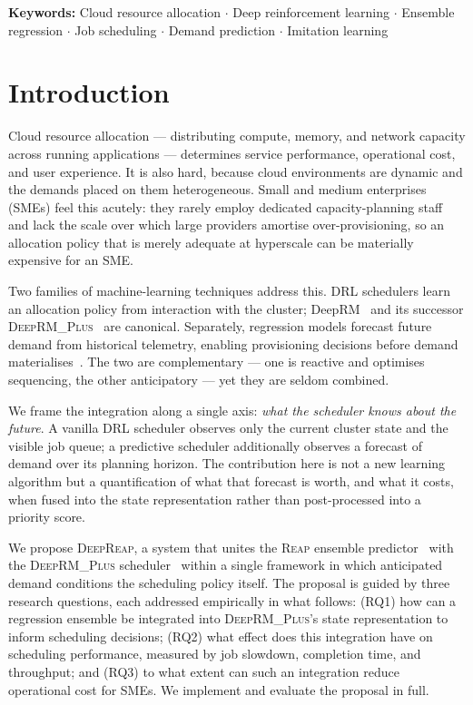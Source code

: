 \documentclass{svproc}
\newcommand{\reap}{\textsc{Reap}}
\newcommand{\deeprm}{\textsc{DeepRM\_Plus}}
\newcommand{\deepreap}{\textsc{DeepReap}}
\begin{document}
\noindent\textbf{Keywords:} Cloud resource allocation $\cdot$ Deep reinforcement learning $\cdot$ Ensemble regression $\cdot$ Job scheduling $\cdot$ Demand prediction $\cdot$ Imitation learning

\section{Introduction}
Cloud resource allocation --- distributing compute, memory, and network
capacity across running applications --- determines service
performance, operational cost, and user experience. It is also hard,
because cloud environments are dynamic and the demands placed on them
heterogeneous. Small and medium enterprises (SMEs) feel this acutely:
they rarely employ dedicated capacity-planning staff and lack the scale
over which large providers amortise over-provisioning, so an allocation
policy that is merely adequate at hyperscale can be materially
expensive for an SME.

Two families of machine-learning techniques address this. DRL
schedulers learn an allocation policy from interaction with the
cluster; DeepRM~\cite{mao2016} and its successor
\deeprm{}~\cite{guo2021} are canonical. Separately, regression models
forecast future demand from historical telemetry, enabling
provisioning decisions before demand
materialises~\cite{bankole2013,kaur2019}. The two are complementary ---
one is reactive and optimises sequencing, the other anticipatory --- yet
they are seldom combined.

We frame the integration along a single axis: \emph{what the scheduler
knows about the future}. A vanilla DRL scheduler observes only the
current cluster state and the visible job queue; a predictive
scheduler additionally observes a forecast of demand over its planning
horizon. The contribution here is not a new learning algorithm but a
quantification of what that forecast is worth, and what it costs, when
fused into the state representation rather than post-processed into a
priority score.

We propose \deepreap{}, a system that unites the \reap{} ensemble
predictor~\cite{kaur2019} with the \deeprm{} scheduler~\cite{guo2021}
within a single framework in which anticipated demand conditions the
scheduling policy itself. The proposal is guided by three research
questions, each addressed empirically in what follows: (RQ1) how can
a regression ensemble be integrated into \deeprm{}'s state
representation to inform scheduling decisions; (RQ2) what effect does
this integration have on scheduling performance, measured by job
slowdown, completion time, and throughput; and (RQ3) to what extent
can such an integration reduce operational cost for SMEs. We implement
and evaluate the proposal in full.
\end{document}
